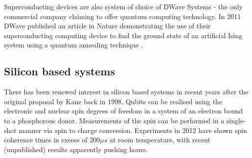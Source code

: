 Superconducting devices are also system of choice of DWave Systems - the only commercial company claiming to offer quantum computing technology. In 2011 DWave published an article in Nature demonstrating the use of their superconducting computing device to find the ground state of an artificial Ising system using a quantum annealing technique \cite{dwave_annealing}.

\subsection{Silicon based systems}

There has been renewed interest in silicon based systems in recent years after the original proposal by Kane back in 1998. Qubits can be realised using the electronic and nuclear spin degrees of freedom in a system of an electron bound to a phosphorous donor. Measurements of the spin can be performed in a single-shot manner via spin to charge conversion. Experiments in 2012 have shown spin coherence times in excess of $200\mu s$ \cite{silicon_qubits, silicon_seconds} at room temperature, with recent (unpublished) results apparently pushing hours.


